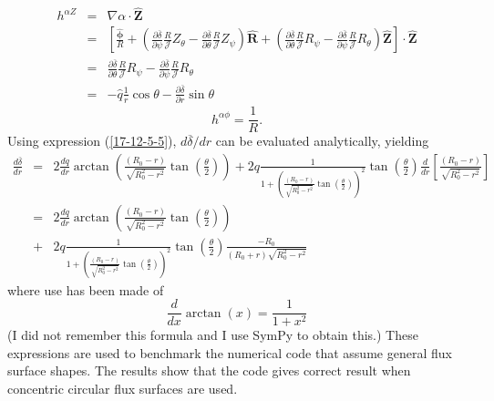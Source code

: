\documentclass{llncs}
\newcommand{\tmmathbf}[1]{\ensuremath{\boldsymbol{#1}}}
\begin{document}
\begin{eqnarray*}
  h^{\alpha Z} & = & \nabla \alpha \cdot \hat{\mathbf{Z}}\\
  & = & \left[ \frac{\hat{\tmmathbf{\phi}}}{R} + \left( \frac{\partial
  \overline{\delta}}{\partial \psi} \frac{R}{\mathcal{J}} Z_{\theta} -
  \frac{\partial \overline{\delta}}{\partial \theta} \frac{R}{\mathcal{J}}
  Z_{\psi} \right) \hat{\mathbf{R}} + \left( \frac{\partial
  \overline{\delta}}{\partial \theta} \frac{R}{\mathcal{J}} R_{\psi} -
  \frac{\partial \overline{\delta}}{\partial \psi} \frac{R}{\mathcal{J}}
  R_{\theta} \right) \hat{\mathbf{Z}} \right] \cdot \hat{\mathbf{Z}}\\
  & = & \frac{\partial \overline{\delta}}{\partial \theta}
  \frac{R}{\mathcal{J}} R_{\psi} - \frac{\partial \overline{\delta}}{\partial
  \psi} \frac{R}{\mathcal{J}} R_{\theta}\\
  & = & - \hat{q} \frac{1}{r} \cos \theta - \frac{\partial
  \overline{\delta}}{\partial r} \sin \theta
\end{eqnarray*}
\begin{equation}
  h^{\alpha \phi} = \frac{1}{R} .
\end{equation}
Using expression (\ref{17-12-5-5}), $d \overline{\delta} / d r$ can be
evaluated analytically, yielding
\begin{eqnarray*}
  \frac{d \overline{\delta}}{d r} & = & 2 \frac{d q}{d r} \arctan \left(
  \frac{(R_0 - r)}{\sqrt{R_0^2 - r^2}} \tan \left( \frac{\theta}{2} \right)
  \right) + 2 q \frac{1}{1 + \left( \frac{(R_0 - r)}{\sqrt{R_0^2 - r^2}} \tan
  \left( \frac{\theta}{2} \right) \right)^2} \tan \left( \frac{\theta}{2}
  \right) \frac{d}{d r} \left[ \frac{(R_0 - r)}{\sqrt{R_0^2 - r^2}} \right]\\
  & = & 2 \frac{d q}{d r} \arctan \left( \frac{(R_0 - r)}{\sqrt{R_0^2 - r^2}}
  \tan \left( \frac{\theta}{2} \right) \right)\\
  & + & 2 q \frac{1}{1 + \left( \frac{(R_0 - r)}{\sqrt{R_0^2 - r^2}} \tan
  \left( \frac{\theta}{2} \right) \right)^2} \tan \left( \frac{\theta}{2}
  \right) \frac{- R_0}{(R_0 + r) \sqrt{R_0^2 - r^2}}
\end{eqnarray*}
where use has been made of
\[ \frac{d}{d x} \arctan (x) = \frac{1}{1 + x^2} \]
(I did not remember this formula and I use SymPy to obtain this.) These
expressions are used to benchmark the numerical code that assume general flux
surface shapes. The results show that the code gives correct result when
concentric circular flux surfaces are used.
\end{document}
